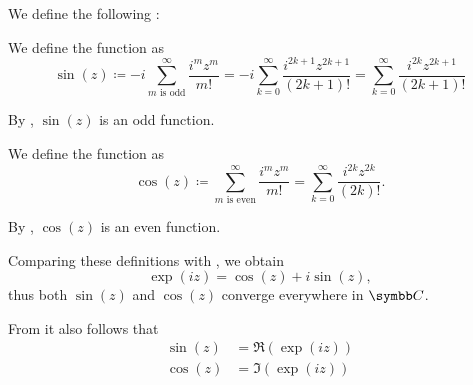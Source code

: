 \begin{definition}\label{def:trigonometric_functions}
  We define the following :

  \begin{defenum}
     We define the  function as
    \begin{equation*}
      \sin(z)
      \coloneqq
      -i \sum_{m \text{ is odd}}^\infty \frac {i^m z^m} {m!}
      =
      -i \sum_{k=0}^\infty \frac {i^{2k+1} z^{2k+1}} {(2k + 1)!}
      =
      \sum_{k=0}^\infty \frac {i^{2k} z^{2k+1}} {(2k + 1)!}
    \end{equation*}

    By , \( \sin(z) \) is an odd function.

     We define the  function as
    \begin{equation*}
      \cos(z)
      \coloneqq
      \sum_{m \text{ is even}}^\infty \frac {i^m z^m} {m!}
      =
      \sum_{k=0}^\infty \frac {i^{2k} z^{2k}} {(2k)!}.
    \end{equation*}

    By , \( \cos(z) \) is an even function.
  \end{defenum}

  Comparing these definitions with , we obtain 
  \begin{equation}\label{def:trigonometric_functions/eulers_formula}
    \exp(iz) = \cos(z) + i \sin(z),
  \end{equation}
  thus both \( \sin(z) \) and \( \cos(z) \) converge everywhere in \( \BC \).

  From  it also follows that
  \begin{align*}
    \sin(z) &= \Re(\exp(iz)) \\
    \cos(z) &= \Im(\exp(iz))
  \end{align*}
\end{definition}


